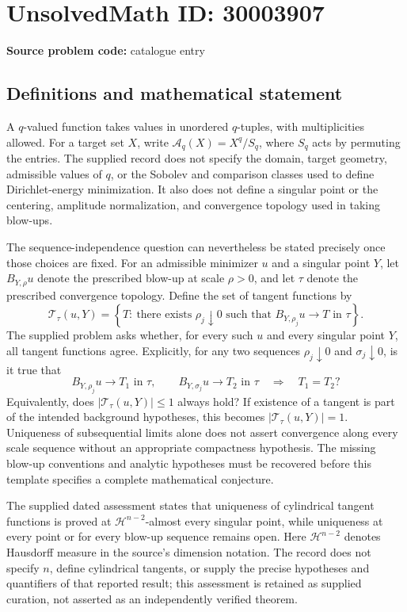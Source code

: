 \documentclass[11pt]{article}
\begin{document}
\section*{UnsolvedMath ID: 30003907}
\textbf{Source problem code:} catalogue entry
\subsection{Definitions and mathematical statement}
A \(q\)-valued function takes values in unordered \(q\)-tuples, with multiplicities allowed. For a target set \(X\), write \(\mathcal A_q(X)=X^q/S_q\), where \(S_q\) acts by permuting the entries. The supplied record does not specify the domain, target geometry, admissible values of \(q\), or the Sobolev and comparison classes used to define Dirichlet-energy minimization. It also does not define a singular point or the centering, amplitude normalization, and convergence topology used in taking blow-ups.

The sequence-independence question can nevertheless be stated precisely once those choices are fixed. For an admissible minimizer \(u\) and a singular point \(Y\), let \(B_{Y,\rho}u\) denote the prescribed blow-up at scale \(\rho>0\), and let \(\tau\) denote the prescribed convergence topology. Define the set of tangent functions by
\[
\mathcal T_\tau(u,Y)=\left\{T:\ \text{there exists }\rho_j\downarrow0\text{ such that }B_{Y,\rho_j}u\longrightarrow T\text{ in }\tau\right\}.
\]
The supplied problem asks whether, for every such \(u\) and every singular point \(Y\), all tangent functions agree. Explicitly, for any two sequences \(\rho_j\downarrow0\) and \(\sigma_j\downarrow0\), is it true that
\[
B_{Y,\rho_j}u\longrightarrow T_1\text{ in }\tau,
\qquad
B_{Y,\sigma_j}u\longrightarrow T_2\text{ in }\tau
\quad\Longrightarrow\quad T_1=T_2?
\]
Equivalently, does \(\lvert\mathcal T_\tau(u,Y)\rvert\leq1\) always hold? If existence of a tangent is part of the intended background hypotheses, this becomes \(\lvert\mathcal T_\tau(u,Y)\rvert=1\). Uniqueness of subsequential limits alone does not assert convergence along every scale sequence without an appropriate compactness hypothesis. The missing blow-up conventions and analytic hypotheses must be recovered before this template specifies a complete mathematical conjecture.

The supplied dated assessment states that uniqueness of cylindrical tangent functions is proved at \(\mathcal H^{n-2}\)-almost every singular point, while uniqueness at every point or for every blow-up sequence remains open. Here \(\mathcal H^{n-2}\) denotes Hausdorff measure in the source's dimension notation. The record does not specify \(n\), define cylindrical tangents, or supply the precise hypotheses and quantifiers of that reported result; this assessment is retained as supplied curation, not asserted as an independently verified theorem.
\end{document}
